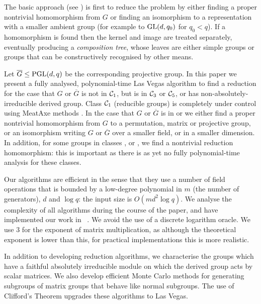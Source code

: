 The basic approach (see \cite{crlg, AkosMaxISSAC}) 
is first to reduce 
the problem by either finding a proper nontrivial homomorphism 
from $G$ or finding an isomorphism to a representation 
with a smaller ambient group (for example to $\GL(d, q_0)$ 
for  $q_0 < q$).  
If a homomorphism is found then the kernel and image are treated
separately, eventually producing a
\emph{composition tree}, whose leaves are either simple groups or
groups that can be constructively  recognised by other means.

 Let 
$\overline{G} \leq \PGL(d, q)$ be the corresponding projective group. 
In this paper we present a fully analysed, polynomial-time Las
Vegas algorithm to find a reduction for the case that  $G$ or $\overline{G}$
 is not in $\mathcal{C}_{1}$, but is in $\mathcal{C}_{3}$ or $\mathcal{C}_{5}$, 
or has non-absolutely-irreducible derived group. 
Class $\mathcal{C}_{1}$ (reducible groups)
 is completely under control using MeatAxe methods
\cite{MeatAxeHoltRees, IL, MeatAxeRP}.
In the case that $G$ or $\overline{G}$ is in  or  
we either find a proper nontrivial homomorphism from $G$ to a permutation, matrix or projective group, or an isomorphism writing $G$ or $\overline{G}$ over a smaller field, or in a smaller dimension. 
  In addition, for some groups in classes ,  or ,
 we find a nontrivial reduction homomorphism: 
this is important as there is as yet no fully 
polynomial-time analysis for these classes. 

Our algorithms are efficient in the sense that they use a 
number of field operations that is bounded by a low-degree polynomial 
in $m$ (the number of generators), $d$ and $\log q$: 
the input size is  $O(m d^2 \log q)$. We analyse 
the complexity of all algorithms during the course 
of the paper, and have implemented our work in \GAP\ \cite{GAP4}. 
We avoid the use of a discrete logarithm oracle. We use $3$ for
 the exponent of matrix multiplication, as although the theoretical 
exponent is lower than this, for practical implementations this is 
more realistic. 

In addition to developing reduction algorithms, we characterise 
the groups which have a faithful absolutely irreducible module
on which the derived group acts by scalar matrices. 
We also develop efficient Monte Carlo 
methods for generating subgroups of matrix groups that behave 
like normal subgroups. The use of Clifford's Theorem 
upgrades these algorithms to Las Vegas. 

